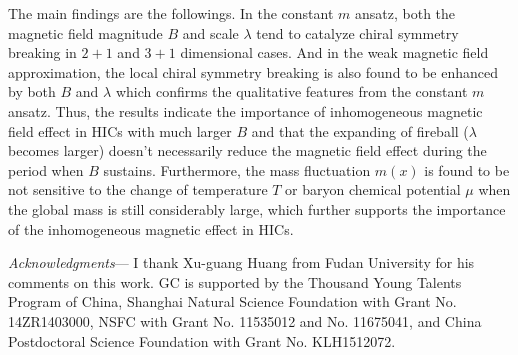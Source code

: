 \documentclass[aps,prd,amsmath,two column,amssymb,showpacs]{revtex4}
\begin{document}
The main findings are the followings. In the constant $m$ ansatz, both the magnetic field magnitude $B$ and scale $\lambda$ tend to catalyze chiral symmetry breaking in $2+1$ and $3+1$ dimensional cases. And in the weak magnetic field approximation, the local chiral symmetry breaking is also found to be enhanced by both $B$ and $\lambda$ which confirms the qualitative features from the constant $m$ ansatz. Thus, the results indicate the importance of inhomogeneous magnetic field effect in HICs with much larger $B$ and that the expanding of fireball ($\lambda$ becomes larger) doesn't necessarily reduce the magnetic field effect during the period when $B$ sustains. Furthermore, the mass fluctuation $m(x)$ is found to be not sensitive to the change of temperature $T$ or baryon chemical potential $\mu$ when the global mass is still considerably large, which further supports the importance of the inhomogeneous magnetic effect in HICs.

\emph{Acknowledgments}---
I thank Xu-guang Huang from Fudan University for his comments on this work. GC is supported by the Thousand Young Talents Program of China, Shanghai Natural Science Foundation with Grant No. 14ZR1403000, NSFC with Grant No. 11535012 and  No. 11675041, and China Postdoctoral Science Foundation with Grant No. KLH1512072.
\end{document}
